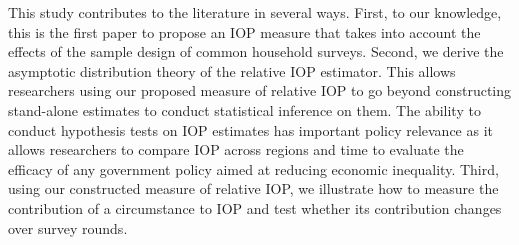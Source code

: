 \documentclass[12pt]{article}
\theoremstyle{plain}
\theoremstyle{definition}
\begin{document}


This study contributes to the literature in several ways. First, to our knowledge, this is the first paper to propose an IOP measure that takes into account the effects of the sample design of common household surveys. Second, we derive the asymptotic distribution theory of the relative IOP estimator. This allows researchers using our proposed measure of relative IOP to go beyond constructing stand-alone estimates to conduct statistical inference on them. The ability to conduct hypothesis tests on IOP estimates has important policy relevance as it allows researchers to compare IOP across regions and time to evaluate the efficacy of any government policy aimed at reducing economic inequality. Third, using our constructed measure of relative IOP, we illustrate how to measure the contribution of a circumstance to IOP and test whether its contribution changes over survey rounds. 
\end{document}
